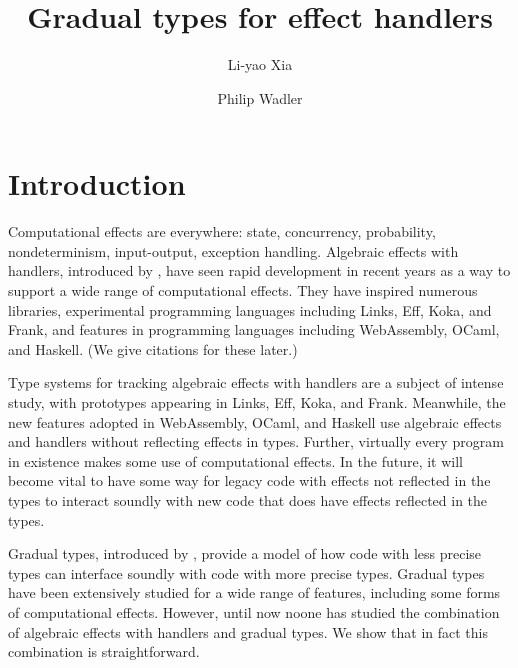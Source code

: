 \documentclass[\ClassReview acmsmall,screen,prologue,dvipsnames,style=authoryear]{acmart}
\author[L. Xia]{Li-yao Xia}
\affiliation{
  \institution{University of Edinburgh}
  \city{Edinburgh}\country{United Kingdom}
}
\author[P. Wadler]{Philip Wadler}
\affiliation{
  \institution{University of Edinburgh}
  \city{Edinburgh}\country{United Kingdom}
}
\title{Gradual types for effect handlers}
\begin{document}
\maketitle

\section{Introduction}

Computational effects are everywhere: state, concurrency, probability,
nondeterminism, input-output, exception handling. Algebraic effects with handlers,
introduced by \citet{plotkin-pretnar-2009},
have seen rapid development in recent years as a way to support a wide range
of computational effects. They have inspired numerous libraries,
experimental programming languages including Links, Eff, Koka, and Frank, and features
in programming languages including WebAssembly, OCaml, and Haskell.
(We give citations for these later.)

Type systems for tracking algebraic effects with handlers are a subject of intense study,
with prototypes appearing in Links, Eff, Koka, and Frank.
Meanwhile, the new features adopted in WebAssembly, OCaml, and Haskell
use algebraic effects and handlers without reflecting effects in types.
Further, virtually every program in existence makes some use of computational
effects. In the future, it will become vital to have some way for legacy
code with effects not reflected in the types to interact soundly with
new code that does have effects reflected in the types.

Gradual types, introduced by \citet{siek-taha-2006},
provide a model of how code with less precise types can interface soundly with
code with more precise types. Gradual types have been extensively studied for a wide
range of features, including some forms of computational effects. However,
until now noone has studied the combination of algebraic effects
with handlers and gradual types. We show that in fact this combination
is straightforward.

% 









%


\end{document}
